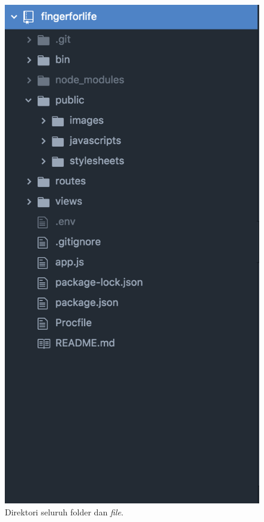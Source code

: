 \begin{figure}[H]
	\centering
	\includegraphics[scale=0.4]{Gambar/direktori}
	\caption{Direktori seluruh folder dan \textit{file}.}
	\label{fig:direktori}
\end{figure}

